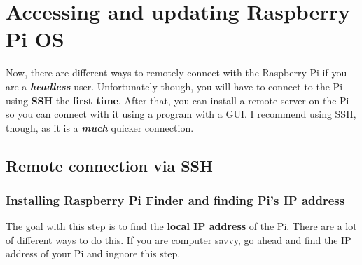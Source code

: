 \documentclass{article}
\begin{document}
\section{Accessing and updating Raspberry Pi OS}

Now, there are different ways to remotely connect with the Raspberry Pi if you are a \textbf{\textit{headless}} user. Unfortunately though, you will have to connect to the Pi using \textbf{SSH} the \textbf{first time}. After that, you can install a remote server on the Pi so you can connect with it using a program with a GUI. I recommend using SSH, though, as it is a \textbf{\textit{much}} quicker connection.

\subsection{Remote connection via SSH}

\subsubsection{Installing Raspberry Pi Finder and finding Pi's IP address}

The goal with this step is to find the \textbf{local IP address} of the Pi. There are a lot of different ways to do this. If you are computer savvy, go ahead and find the IP address of your Pi and ingnore this step.
\end{document}
